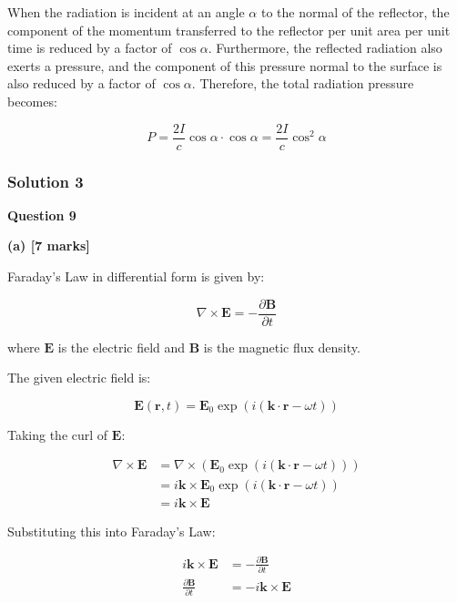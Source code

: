 \documentclass{article}
\begin{document}
When the radiation is incident at an angle $\alpha$ to the normal of the reflector, the component of the momentum transferred to the reflector per unit area per unit time is reduced by a factor of $\cos \alpha$.  Furthermore, the reflected radiation also exerts a pressure, and the component of this pressure normal to the surface is also reduced by a factor of $\cos \alpha$.  Therefore, the total radiation pressure becomes:

\begin{equation*}
P = \frac{2I}{c} \cos \alpha \cdot \cos \alpha = \frac{2I}{c} \cos^2 \alpha
\end{equation*}

\subsubsection{Solution 3}
\textbf{Question 9}

\textbf{(a) [7 marks]}

Faraday's Law in differential form is given by:

\begin{equation*}
\nabla \times \mathbf{E} = -\frac{\partial \mathbf{B}}{\partial t}
\end{equation*}

where $\mathbf{E}$ is the electric field and $\mathbf{B}$ is the magnetic flux density.  

The given electric field is:

\begin{equation*}
\mathbf{E}(\mathbf{r}, t) = \mathbf{E}_0 \exp(i (\mathbf{k} \cdot \mathbf{r} - \omega t))
\end{equation*}

Taking the curl of $\mathbf{E}$:

\begin{align*}
\nabla \times \mathbf{E} &= \nabla \times (\mathbf{E}_0 \exp(i (\mathbf{k} \cdot \mathbf{r} - \omega t))) \\
&= i \mathbf{k} \times \mathbf{E}_0 \exp(i (\mathbf{k} \cdot \mathbf{r} - \omega t)) \\
&= i \mathbf{k} \times \mathbf{E}
\end{align*}

Substituting this into Faraday's Law:

\begin{align*}
i \mathbf{k} \times \mathbf{E} &= -\frac{\partial \mathbf{B}}{\partial t} \\
\frac{\partial \mathbf{B}}{\partial t} &= -i \mathbf{k} \times \mathbf{E}
\end{align*}
\end{document}

